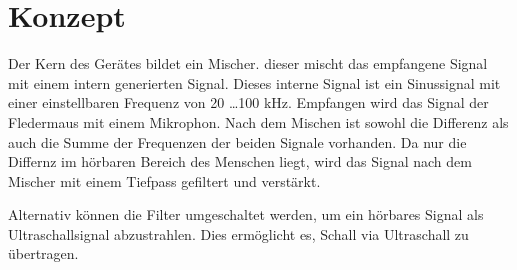\section{Konzept}
Der Kern des Gerätes bildet ein Mischer. dieser mischt das empfangene Signal 
mit einem intern generierten Signal. Dieses interne Signal ist ein Sinussignal 
mit einer einstellbaren Frequenz von 20 \ldots 100 kHz. Empfangen wird das 
Signal der Fledermaus mit einem Mikrophon. Nach dem Mischen ist sowohl die 
Differenz als auch die Summe der Frequenzen der beiden Signale vorhanden. 
Da nur die Differnz im hörbaren Bereich des Menschen liegt, wird das Signal 
nach dem Mischer mit einem Tiefpass gefiltert und verstärkt. 

Alternativ können die Filter umgeschaltet werden, um ein hörbares Signal 
als Ultraschallsignal abzustrahlen. Dies ermöglicht es, Schall via 
Ultraschall zu übertragen. 
